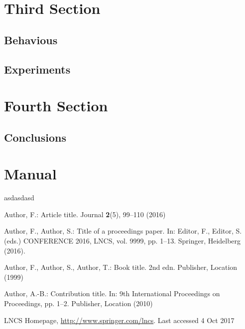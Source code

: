 \documentclass[runningheads]{llncs}
\begin{document}
\section{Third Section}
\subsection{Behavious}
\subsection{Experiments}


\section{Fourth Section}
\subsection{Conclusions}

\section{Manual}
asdasdasd

%
%
%
% 
% 
%
\begin{thebibliography}{8}
Author, F.: Article title. Journal \textbf{2}(5), 99--110 (2016)

Author, F., Author, S.: Title of a proceedings paper. In: Editor,
F., Editor, S. (eds.) CONFERENCE 2016, LNCS, vol. 9999, pp. 1--13.
Springer, Heidelberg (2016). 

Author, F., Author, S., Author, T.: Book title. 2nd edn. Publisher,
Location (1999)

Author, A.-B.: Contribution title. In: 9th International Proceedings
on Proceedings, pp. 1--2. Publisher, Location (2010)

LNCS Homepage, \url{http://www.springer.com/lncs}. Last accessed 4
Oct 2017
\end{thebibliography}
\end{document}
